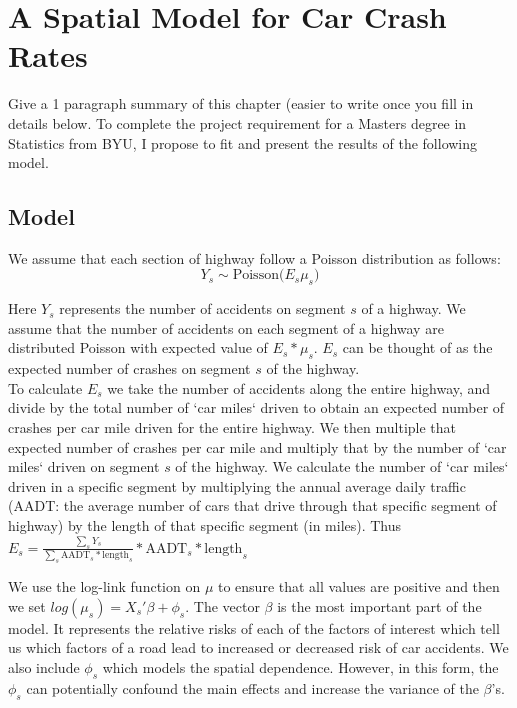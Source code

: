 \chapter{A Spatial Model for Car Crash Rates}
Give a 1 paragraph summary of this chapter (easier to write once you fill in details below.
 To complete the project requirement for a Masters degree in Statistics from BYU, I propose to fit and present the results of the following model.

\section{Model}
We assume that each section of highway follow a Poisson distribution as follows:
$$  Y_s \sim \textrm{Poisson}\big( E_s \mu_s\big) $$

Here $Y_s$ represents the number of accidents on segment $s$ of a highway. We assume that the number of accidents on each segment of a highway are distributed Poisson with expected value of $E_s * \mu_s$. $ E_s$ can be thought of as the expected number of crashes on segment $s$ of the highway. \\

  To calculate $E_s$ we take the number of accidents along the entire highway, and divide by the total number of `car miles` driven to obtain an expected number of crashes per car mile driven for the entire highway. We then multiple that expected number of crashes per car mile and multiply that by the number of `car miles` driven on segment $s$ of the highway. We calculate the number of `car miles` driven in a specific segment by multiplying the annual average daily traffic (AADT: the average number of cars that drive through that specific segment of highway) by the length of that specific segment (in miles). Thus $E_s = \frac{\sum_s Y_s}{\sum_s \textrm{AADT}_s * \textrm{length}_s} * \textrm{AADT}_s * \textrm{length}_s $ 
  
  
We use the log-link function on $\mu$ to ensure that all values are positive and then we set $ log(\mu_s) =  X_s' \beta + \phi_s $. The vector $\beta$ is the most important part of the model. It represents the relative risks of each of the factors of interest which tell us which factors of a road lead to increased or decreased risk of car accidents. We also include $\phi_s$ which models the spatial dependence. However, in this form, the $\phi_s$ can potentially confound the main effects and increase the variance of the $\beta$'s. \\


